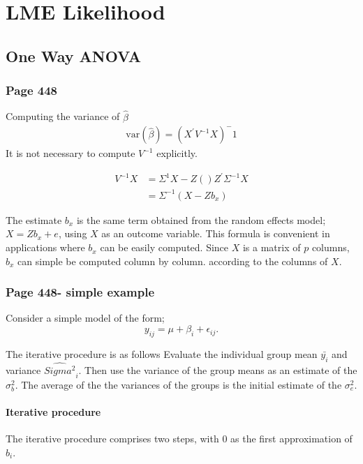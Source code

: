 \documentclass[12pt, a4paper]{report}
\theoremstyle{plain}
\theoremstyle{definition}
\theoremstyle{remark}
\begin{document}


	\chapter{LME Likelihood}
	\section{One Way ANOVA}
	\subsection{Page 448}
	Computing the variance of $\hat{\beta}$
	\begin{eqnarray}
	\mbox{var}(\hat{\beta}) = (X^{\prime}V^{-1}X)^-1
	\end{eqnarray}
	It is not necessary to compute $V^{-1}$ explicitly.
	
	\begin{eqnarray}
	V^{-1}X &= \Sigma^{1}{X-Z()Z^{\prime}\Sigma^{-1}X} \\
	&= \Sigma^{-1}(X-Zb_{x})
	\end{eqnarray}
	
	The estimate $b_{x}$ is the same term obtained from the random effects model; $X = Zb_{x} + e$, using $X$ as an outcome variable.
	This formula is convenient in applications where $b_{x}$ can be easily computed. Since $X$ is a matrix of $p$ columns, $b_{x}$ can simple be computed column by column. according to the columns of $X$.
	\subsection{Page 448- simple example}
	Consider a simple model of the form;
	\begin{equation*}
	y_{ij} = \mu + \beta_{i} + \epsilon_{ij}.
	\end{equation*}
	
	The iterative procedure is as follows Evaluate the individual group mean $\bar{y_{i}}$ and variance $\hat{Sigma^2}_{i}$. Then use the variance of the group means as an estimate of the $\sigma^2_{b}$. The average of the the variances of the groups is the initial estimate of the $\sigma^2_{e}$.
	\subsubsection{Iterative procedure}
	
	The iterative procedure comprises two steps, with $0$ as the first approximation of $b_{i}$.
	
\end{document}
